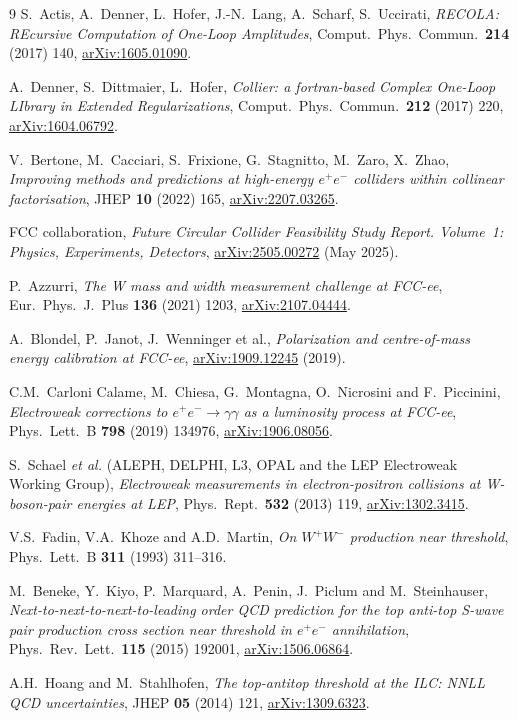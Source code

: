 \documentclass[11pt,a4paper]{article}
\newcommand{\arxiv}[1]{\href{https://arxiv.org/abs/#1}{arXiv:#1}}
\begin{document}
\begin{thebibliography}{9}
S.~Actis, A.~Denner, L.~Hofer, J.-N.~Lang, A.~Scharf, S.~Uccirati,
\emph{RECOLA: REcursive Computation of One-Loop Amplitudes},
Comput.\ Phys.\ Commun.\ \textbf{214} (2017) 140, \arxiv{1605.01090}.

A.~Denner, S.~Dittmaier, L.~Hofer,
\emph{Collier: a fortran-based Complex One-Loop LIbrary in Extended Regularizations},
Comput.\ Phys.\ Commun.\ \textbf{212} (2017) 220, \arxiv{1604.06792}.

V.~Bertone, M.~Cacciari, S.~Frixione, G.~Stagnitto, M.~Zaro, X.~Zhao,
\emph{Improving methods and predictions at high-energy $e^+e^-$ colliders
within collinear factorisation},
JHEP \textbf{10} (2022) 165, \arxiv{2207.03265}.

FCC collaboration,
\emph{Future Circular Collider Feasibility Study Report.
Volume~1: Physics, Experiments, Detectors},
\arxiv{2505.00272} (May 2025).

P.~Azzurri,
\emph{The W mass and width measurement challenge at FCC-ee},
Eur.\ Phys.\ J.\ Plus \textbf{136} (2021) 1203,
\arxiv{2107.04444}.

A.~Blondel, P.~Janot, J.~Wenninger et al.,
\emph{Polarization and centre-of-mass energy calibration at FCC-ee},
\arxiv{1909.12245} (2019).

C.M.~Carloni Calame, M.~Chiesa, G.~Montagna, O.~Nicrosini and F.~Piccinini,
\emph{Electroweak corrections to $e^+e^-\!\to\gamma\gamma$ as a
luminosity process at FCC-ee},
Phys.\ Lett.\ B \textbf{798} (2019) 134976,
\arxiv{1906.08056}.

S.~Schael \emph{et al.} (ALEPH, DELPHI, L3, OPAL and the LEP Electroweak
Working Group),
\emph{Electroweak measurements in electron-positron collisions at
W-boson-pair energies at LEP},
Phys.\ Rept.\ \textbf{532} (2013) 119,
\arxiv{1302.3415}.

V.S.~Fadin, V.A.~Khoze and A.D.~Martin,
\emph{On $W^+W^-$ production near threshold},
Phys.\ Lett.\ B \textbf{311} (1993) 311--316.

M.~Beneke, Y.~Kiyo, P.~Marquard, A.~Penin, J.~Piclum and M.~Steinhauser,
\emph{Next-to-next-to-next-to-leading order QCD prediction for the
top anti-top S-wave pair production cross section near threshold in
$e^+e^-$ annihilation},
Phys.\ Rev.\ Lett.\ \textbf{115} (2015) 192001,
\arxiv{1506.06864}.

A.H.~Hoang and M.~Stahlhofen,
\emph{The top-antitop threshold at the ILC: NNLL QCD uncertainties},
JHEP \textbf{05} (2014) 121,
\arxiv{1309.6323}.

\end{thebibliography}
\end{document}
